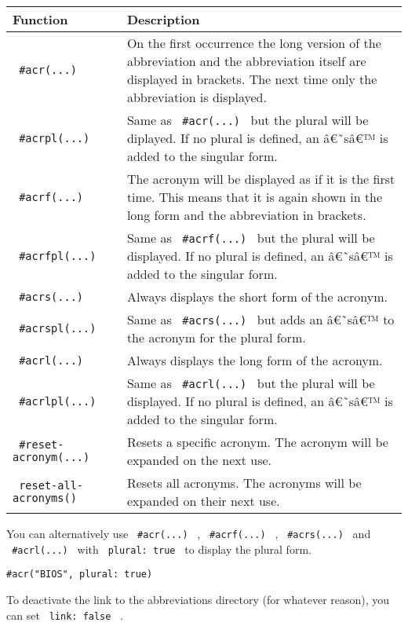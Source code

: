 \begin{longtable}[]{@{}ll@{}}
\toprule\noalign{}
Function & Description \\
\midrule\noalign{}
\endhead
\bottomrule\noalign{}
\endlastfoot
\texttt{\ \#acr(...)\ } & On the first occurrence the long version of
the abbreviation and the abbreviation itself are displayed in brackets.
The next time only the abbreviation is displayed. \\
\texttt{\ \#acrpl(...)\ } & Same as \texttt{\ \#acr(...)\ } but the
plural will be diplayed. If no plural is defined, an â€˜sâ€™ is added to
the singular form. \\
\texttt{\ \#acrf(...)\ } & The acronym will be displayed as if it is the
first time. This means that it is again shown in the long form and the
abbreviation in brackets. \\
\texttt{\ \#acrfpl(...)\ } & Same as \texttt{\ \#acrf(...)\ } but the
plural will be displayed. If no plural is defined, an â€˜sâ€™ is added
to the singular form. \\
\texttt{\ \#acrs(...)\ } & Always displays the short form of the
acronym. \\
\texttt{\ \#acrspl(...)\ } & Same as \texttt{\ \#acrs(...)\ } but adds
an â€˜sâ€™ to the acronym for the plural form. \\
\texttt{\ \#acrl(...)\ } & Always displays the long form of the
acronym. \\
\texttt{\ \#acrlpl(...)\ } & Same as \texttt{\ \#acrl(...)\ } but the
plural will be displayed. If no plural is defined, an â€˜sâ€™ is added
to the singular form. \\
\texttt{\ \#reset-acronym(...)\ } & Resets a specific acronym. The
acronym will be expanded on the next use. \\
\texttt{\ reset-all-acronyms()\ } & Resets all acronyms. The acronyms
will be expanded on their next use. \\
\end{longtable}

You can alternatively use \texttt{\ \#acr(...)\ } ,
\texttt{\ \#acrf(...)\ } , \texttt{\ \#acrs(...)\ } and
\texttt{\ \#acrl(...)\ } with \texttt{\ plural:\ true\ } to display the
plural form.

\begin{verbatim}
#acr("BIOS", plural: true)
\end{verbatim}

To deactivate the link to the abbreviations directory (for whatever
reason), you can set \texttt{\ link:\ false\ } .

